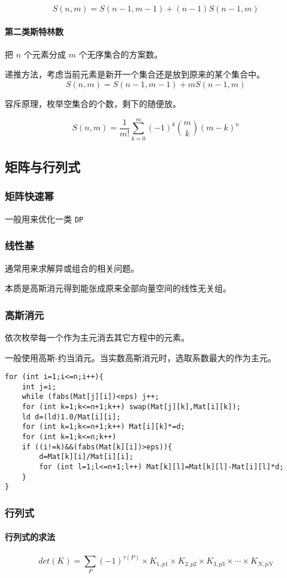 \documentclass[UTF-8]{ctexart}
\begin{document}
	$$S(n,m)=S(n-1,m-1)+(n-1)S(n-1,m)$$
	\paragraph{第二类斯特林数} 把 $n$ 个元素分成 $m$ 个无序集合的方案数。
	
	递推方法，考虑当前元素是新开一个集合还是放到原来的某个集合中。
	$$S(n,m)=S(n-1,m-1)+mS(n-1,m)$$
	
	容斥原理，枚举空集合的个数，剩下的随便放。
	
	$$S(n,m)={\frac 1 {m!}}\sum_{k=0}^m (-1)^k {m \choose k}(m-k)^n$$
	\subsection{矩阵与行列式}
	\subsubsection{矩阵快速幂}
	一般用来优化一类 \texttt{DP}
	\subsubsection{线性基}
	通常用来求解异或组合的相关问题。
	
	本质是高斯消元得到能张成原来全部向量空间的线性无关组。
	\subsubsection{高斯消元}
	依次枚举每一个作为主元消去其它方程中的元素。
	
	一般使用高斯-约当消元。当实数高斯消元时，选取系数最大的作为主元。
\begin{verbatim}
for (int i=1;i<=n;i++){
    int j=i;
    while (fabs(Mat[j][i])<eps) j++;
    for (int k=1;k<=n+1;k++) swap(Mat[j][k],Mat[i][k]);
    ld d=(ld)1.0/Mat[i][i];
    for (int k=1;k<=n+1;k++) Mat[i][k]*=d;
    for (int k=1;k<=n;k++)
    if ((i!=k)&&(fabs(Mat[k][i])>eps)){
        d=Mat[k][i]/Mat[i][i];
        for (int l=1;l<=n+1;l++) Mat[k][l]=Mat[k][l]-Mat[i][l]*d;
    }
}
\end{verbatim}
	\subsubsection{行列式}
	\paragraph{行列式的求法}
	$$det(K)=\sum _ {P}{(-1)}^{\tau{(P)}}\times{K} _ {1,p1}\times{K} _  {2,p2}\times{K}  _ {3,p3}\times\cdots\times{K} _ {N,pN}$$
	
\end{document}
